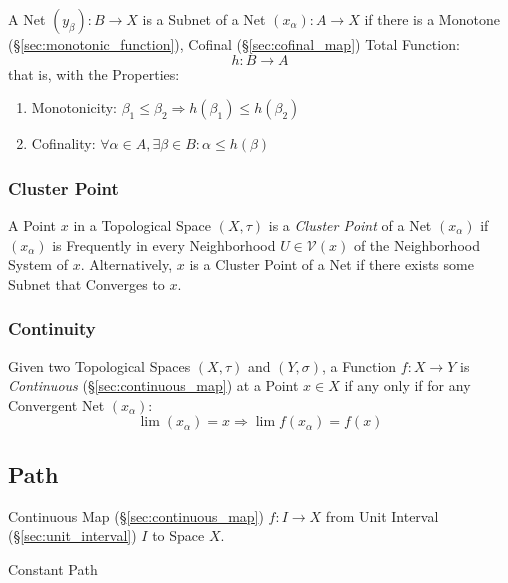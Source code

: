 A Net $(y_\beta) : B \rightarrow X$ is a Subnet of a Net $(x_\alpha) :
A \rightarrow X$ if there is a Monotone
(\S\ref{sec:monotonic_function}), Cofinal (\S\ref{sec:cofinal_map})
Total Function:
\[
  h : B \rightarrow A
\]
that is, with the Properties:
\begin{enumerate}
  \item Monotonicity:
  $\beta_1 \leq \beta_2 \Rightarrow h(\beta_1) \leq h(\beta_2)$
  \item Cofinality:
   $\forall \alpha \in A, \exists \beta \in B : \alpha \leq h(\beta)$
\end{enumerate}



\subsubsection{Cluster Point}\label{sec:cluster_point}

A Point $x$ in a Topological Space $(X,\tau)$ is a \emph{Cluster
  Point} of a Net $(x_\alpha)$ if $(x_\alpha)$ is Frequently in every
Neighborhood $U \in \mathcal{V}(x)$ of the Neighborhood System of $x$.
Alternatively, $x$ is a Cluster Point of a Net if there exists some
Subnet that Converges to $x$.



\subsubsection{Continuity}\label{sec:net_continuity}

Given two Topological Spaces $(X,\tau)$ and $(Y,\sigma)$, a Function
$f : X \rightarrow Y$ is \emph{Continuous}
(\S\ref{sec:continuous_map}) at a Point $x \in X$ if any only if for
any Convergent Net $(x_\alpha)$:
\[
  \lim (x_\alpha) = x \Rightarrow \lim f(x_\alpha) = f(x)
\]



\subsection{Path}\label{sec:path} \cite{hatcher02}

Continuous Map (\S\ref{sec:continuous_map}) $f : I \rightarrow X$ from
Unit Interval (\S\ref{sec:unit_interval}) $I$ to Space $X$.

Constant Path %

